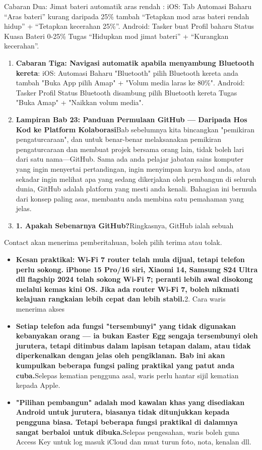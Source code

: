 \begin{tcbpractice}{Cabaran Dua: Jimat bateri automatik aras rendah}
: iOS: Tab Automasi Baharu “Aras bateri” kurang daripada 25\% tambah “Tetapkan mod aras bateri rendah hidup” + “Tetapkan kecerahan 25\%”. Android: Tasker buat Profil baharu Status Kuasa Bateri 0-25\% Tugas “Hidupkan mod jimat bateri” + “Kurangkan kecerahan”.

\begin{enumerate}
  \item \textbf{Cabaran Tiga: Navigasi automatik apabila menyambung Bluetooth kereta}: iOS: Automasi Baharu "Bluetooth" pilih Bluetooth kereta anda tambah "Buka App pilih Amap" + "Volum media laras ke 80\%". Android: Tasker Profil Status Bluetooth disambung pilih Bluetooth kereta Tugas "Buka Amap" + "Naikkan volum media".
  \item \textbf{Lampiran Bab 23: Panduan Permulaan GitHub — Daripada Hos Kod ke Platform Kolaborasi}Bab sebelumnya kita bincangkan "pemikiran pengaturcaraan", dan untuk benar-benar melaksanakan pemikiran pengaturcaraan dan membuat projek bersama orang lain, tidak boleh lari dari satu nama—GitHub. Sama ada anda pelajar jabatan sains komputer yang ingin menyertai pertandingan, ingin menyimpan karya kod anda, atau sekadar ingin melihat apa yang sedang dikerjakan oleh pembangun di seluruh dunia, GitHub adalah platform yang mesti anda kenali. Bahagian ini bermula dari konsep paling asas, membantu anda membina satu pemahaman yang jelas.
  \item \textbf{1. Apakah Sebenarnya GitHub?}Ringkasnya, GitHub ialah sebuah
\end{enumerate}

\end{tcbpractice}

\begin{tcbinfo}{Contact akan menerima pemberitahuan, boleh pilih terima atau tolak.}
\begin{itemize}
  \item \textbf{Kesan praktikal: Wi-Fi 7 router telah mula dijual, tetapi telefon perlu sokong. iPhone 15 Pro/16 siri, Xiaomi 14, Samsung S24 Ultra dll flagship 2024 telah sokong Wi-Fi 7; peranti lebih awal disokong melalui kemas kini OS. Jika ada router Wi-Fi 7, boleh nikmati kelajuan rangkaian lebih cepat dan lebih stabil.}2. Cara waris menerima akses
  \item \textbf{Setiap telefon ada fungsi "tersembunyi" yang tidak digunakan kebanyakan orang — ia bukan Easter Egg sengaja tersembunyi oleh jurutera, tetapi ditimbus dalam lapisan tetapan dalam, atau tidak diperkenalkan dengan jelas oleh pengiklanan. Bab ini akan kumpulkan beberapa fungsi paling praktikal yang patut anda cuba.}Selepas kematian pengguna asal, waris perlu hantar sijil kematian kepada Apple.
  \item \textbf{"Pilihan pembangun" adalah mod kawalan khas yang disediakan Android untuk jurutera, biasanya tidak ditunjukkan kepada pengguna biasa. Tetapi beberapa fungsi praktikal di dalamnya sangat berbaloi untuk dibuka.}Selepas pengesahan, waris boleh guna Access Key untuk log masuk iCloud dan muat turun foto, nota, kenalan dll.
\end{itemize}

\end{tcbinfo}
